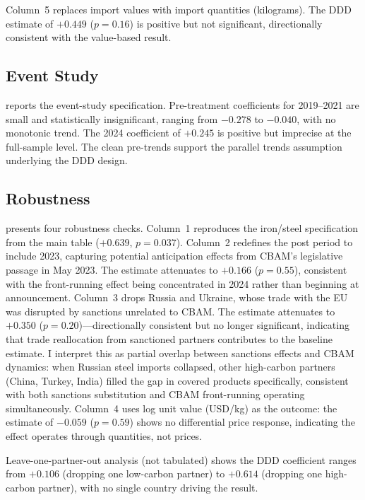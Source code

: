 \documentclass[12pt]{article}
\begin{document}
Column~5 replaces import values with import quantities (kilograms). The DDD estimate of $+0.449$ ($p = 0.16$) is positive but not significant, directionally consistent with the value-based result.



\subsection{Event Study}

 reports the event-study specification. Pre-treatment coefficients for 2019--2021 are small and statistically insignificant, ranging from $-0.278$ to $-0.040$, with no monotonic trend. The 2024 coefficient of $+0.245$ is positive but imprecise at the full-sample level. The clean pre-trends support the parallel trends assumption underlying the DDD design.



\subsection{Robustness}

 presents four robustness checks. Column~1 reproduces the iron/steel specification from the main table ($+0.639$, $p = 0.037$). Column~2 redefines the post period to include 2023, capturing potential anticipation effects from CBAM's legislative passage in May 2023. The estimate attenuates to $+0.166$ ($p = 0.55$), consistent with the front-running effect being concentrated in 2024 rather than beginning at announcement. Column~3 drops Russia and Ukraine, whose trade with the EU was disrupted by sanctions unrelated to CBAM. The estimate attenuates to $+0.350$ ($p = 0.20$)---directionally consistent but no longer significant, indicating that trade reallocation from sanctioned partners contributes to the baseline estimate. I interpret this as partial overlap between sanctions effects and CBAM dynamics: when Russian steel imports collapsed, other high-carbon partners (China, Turkey, India) filled the gap in covered products specifically, consistent with both sanctions substitution and CBAM front-running operating simultaneously. Column~4 uses log unit value (USD/kg) as the outcome: the estimate of $-0.059$ ($p = 0.59$) shows no differential price response, indicating the effect operates through quantities, not prices.

Leave-one-partner-out analysis (not tabulated) shows the DDD coefficient ranges from $+0.106$ (dropping one low-carbon partner) to $+0.614$ (dropping one high-carbon partner), with no single country driving the result.
\end{document}
